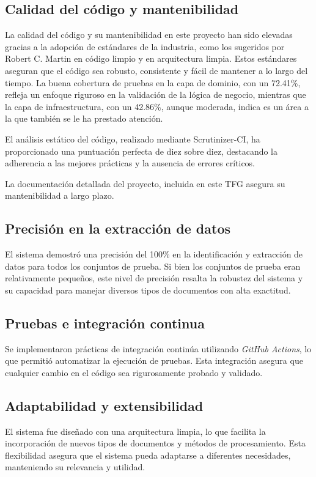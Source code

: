 \subsection*{Calidad del código y mantenibilidad}

La calidad del código y su mantenibilidad en este proyecto han sido elevadas gracias a la adopción de estándares de la
industria, como los sugeridos por Robert C. Martin en código limpio y en arquitectura limpia.
Estos estándares aseguran que el código sea robusto, consistente y fácil de mantener a lo largo del tiempo.
La buena cobertura de pruebas en la capa de dominio, con un 72.41\%, refleja un enfoque riguroso en la validación de la
lógica de negocio, mientras que la capa de infraestructura, con un 42.86\%, aunque moderada, indica es un área a la
que también se le ha prestado atención.

El análisis estático del código, realizado mediante Scrutinizer-CI, ha proporcionado una puntuación perfecta de diez
sobre diez, destacando la adherencia a las mejores prácticas y la ausencia de errores críticos.

La documentación detallada del proyecto, incluida en este TFG asegura su mantenibilidad a largo plazo.

\subsection*{Precisión en la extracción de datos}

El sistema demostró una precisión del 100\% en la identificación y extracción de datos para todos los conjuntos de
prueba.
Si bien los conjuntos de prueba eran relativamente pequeños, este nivel de precisión resalta la robustez del sistema y
su capacidad para manejar diversos tipos de documentos con alta exactitud.

\subsection*{Pruebas e integración continua}

Se implementaron prácticas de integración continúa utilizando \textit{GitHub Actions}, lo que permitió automatizar la
ejecución de pruebas.
Esta integración asegura que cualquier cambio en el código sea rigurosamente probado y validado.

\subsection*{Adaptabilidad y extensibilidad}

El sistema fue diseñado con una arquitectura limpia, lo que facilita la incorporación de nuevos tipos de documentos y
métodos de procesamiento.
Esta flexibilidad asegura que el sistema pueda adaptarse a diferentes necesidades, manteniendo su relevancia y utilidad.